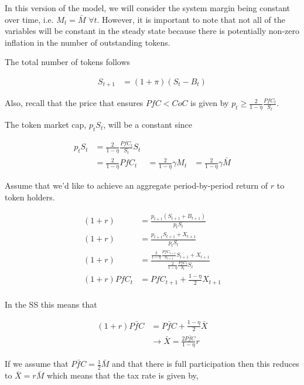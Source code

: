 
In this version of the model, we will consider the system margin being constant over time, i.e.
$M_t = \bar{M}$ $\forall t$. However, it is important to note that not all of the variables will be
constant in the steady state because there is potentially non-zero inflation in the number of
outstanding tokens.

The total number of tokens follows

\begin{align*}
  S_{t+1} &= (1 + \pi) (S_t - B_t)
\end{align*}

Also, recall that the price that ensures $PfC < CoC$ is given by
$p_t \geq \frac{2}{1 - \eta} \frac{PfC_t}{S_t}$.

The token market cap, $p_t S_t$, will be a constant since

\begin{align*}
  p_t S_t &= \frac{2}{1 - \eta} \frac{PfC_t}{S_t} S_t \\
  &= \frac{2}{1 - \eta} PfC_t
  &= \frac{2}{1 - \eta} \gamma M_t
  &= \frac{2}{1 - \eta} \gamma \bar{M}
\end{align*}

Assume that we'd like to achieve an aggregate period-by-period return of $r$ to token holders.

\begin{align*}
  (1 + r) &= \frac{p_{t+1} (S_{t+1} + B_{t+1})}{p_t S_t} \\
  (1 + r) &= \frac{p_{t+1} S_{t+1} + X_{t+1}}{p_t S_t} \\
  (1 + r) &= \frac{\frac{2}{1 - \eta} \frac{PfC_{t+1}}{S_{t+1}} S_{t+1} + X_{t+1}}{\frac{2}{1 - \eta} \frac{PfC_{t}}{S_t} S_t} \\
  (1 + r) PfC_{t} &= PfC_{t+1} + \frac{1 - \eta}{2} X_{t+1} \\
\end{align*}

In the SS this means that

\begin{align*}
  (1 + r) \bar{PfC} &= \bar{PfC} + \frac{1 - \eta}{2} \bar{X} \\
  &\rightarrow \bar{X} = \frac{2 \bar{PfC}}{1 - \eta} r
\end{align*}

If we assume that $\bar{PfC} = \frac{1}{2} \bar{M}$ and that there is full participation then this
reduces to $\bar{X} = r \bar{M}$ which means that the tax rate is given by,

